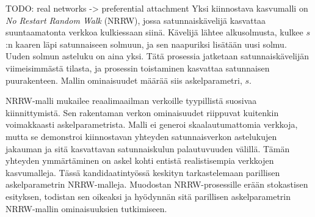 \documentclass[finnish, 12pt, a4paper, sci, utf8, pdfa]{aaltothesis}
\date{1.5.2018}
\begin{document}
	
\makecoverpage

\makecopyrightpage

\begin{abstractpage}[finnish]
TODO: real networks -> preferential attachment
Yksi kiinnostava kasvumalli on \textit{No Restart Random Walk} (NRRW), jossa satunnaiskävelijä kasvattaa suuntaamatonta verkkoa 
kulkiessaan siinä. Kävelijä lähtee alkusolmusta, kulkee $ s $:n kaaren läpi satunnaiseen solmuun, ja sen naapuriksi lisätään 
uusi solmu. Uuden solmun asteluku on aina yksi. Tätä prosessia jatketaan satunnaiskävelijän viimeisimmästä tilasta, ja prosessin 
toistaminen kasvattaa satunnaisen puurakenteen. Mallin ominaisuudet määrää siis askelparametri, $ s $. 

NRRW-malli mukailee reaalimaailman verkoille tyypillistä suosivaa kiinnittymistä. Sen rakentaman verkon ominaisuudet riippuvat 
kuitenkin voimakkaasti askelparametrista. Malli ei generoi skaalautumattomia verkkoja, mutta se demonstroi kiinnostavan yhteyden 
satunnaisverkon astelukujen jakauman ja sitä kasvattavan satunnaiskulun palautuvuuden välillä. Tämän yhteyden ymmärtäminen on askel 
kohti entistä realistisempia verkkojen kasvumalleja. Tässä kandidaatintyössä keskityn tarkastelemaan parillisen askelparametrin 
NRRW-malleja. Muodostan NRRW-prosessille erään stokastisen esityksen, todistan sen oikeaksi ja hyödynnän sitä parillisen askelparametrin 
NRRW-mallin ominaisuuksien tutkimiseen.
\end{abstractpage}

\end{document}

